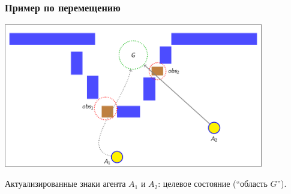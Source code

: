 \documentclass[default]{beamer}
\begin{document}
	\begin{frame}
		\frametitle{Пример по перемещению}
		
		\begin{center}
			\includegraphics[page=171,width=0.85\textwidth]{examples/slides_colored}
		\end{center}
		\par\bigskip
		Актуализированные знаки агента $A_1$ и $A_2$: целевое состояние (``область $G$'').
	\end{frame}
	
\end{document}
